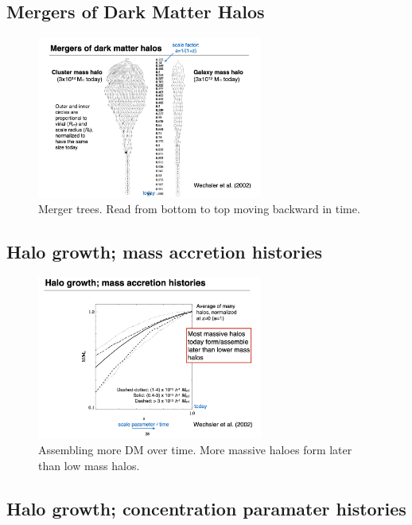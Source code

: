 \documentclass{article}
\begin{document}
\subsection{Mergers of Dark Matter Halos}

\begin{figure}
    \centering
\includegraphics[width=0.66\textwidth]{figs/Screen Shot 2021-10-13 at 10.40.32 AM.png}
    \caption{Merger trees. Read from bottom to top moving backward in time. }
    \label{fig:Merger_Trees}
\end{figure}

\subsection{Halo growth; mass accretion histories}

\begin{figure}
    \centering
\includegraphics[width=0.66\textwidth]{figs/Screen Shot 2021-10-13 at 10.43.20 AM.png}
    \caption{Assembling more DM over time. More massive haloes form later than low mass halos. }
    \label{fig:masses_}
\end{figure}

\subsection{Halo growth; concentration paramater histories}
\end{document}
